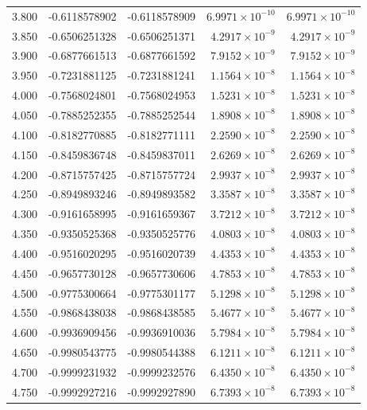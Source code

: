 \documentclass[11pt,a4paper]{article}
\begin{document}
\begin{longtable}{rrrrr}
3.800 & -0.6118578902 & -0.6118578909 & $6.9971\times 10^{-10}$ & $6.9971\times 10^{-10}$ \\
3.850 & -0.6506251328 & -0.6506251371 & $4.2917\times 10^{-9}$ & $4.2917\times 10^{-9}$ \\
3.900 & -0.6877661513 & -0.6877661592 & $7.9152\times 10^{-9}$ & $7.9152\times 10^{-9}$ \\
3.950 & -0.7231881125 & -0.7231881241 & $1.1564\times 10^{-8}$ & $1.1564\times 10^{-8}$ \\
4.000 & -0.7568024801 & -0.7568024953 & $1.5231\times 10^{-8}$ & $1.5231\times 10^{-8}$ \\
4.050 & -0.7885252355 & -0.7885252544 & $1.8908\times 10^{-8}$ & $1.8908\times 10^{-8}$ \\
4.100 & -0.8182770885 & -0.8182771111 & $2.2590\times 10^{-8}$ & $2.2590\times 10^{-8}$ \\
4.150 & -0.8459836748 & -0.8459837011 & $2.6269\times 10^{-8}$ & $2.6269\times 10^{-8}$ \\
4.200 & -0.8715757425 & -0.8715757724 & $2.9937\times 10^{-8}$ & $2.9937\times 10^{-8}$ \\
4.250 & -0.8949893246 & -0.8949893582 & $3.3587\times 10^{-8}$ & $3.3587\times 10^{-8}$ \\
4.300 & -0.9161658995 & -0.9161659367 & $3.7212\times 10^{-8}$ & $3.7212\times 10^{-8}$ \\
4.350 & -0.9350525368 & -0.9350525776 & $4.0803\times 10^{-8}$ & $4.0803\times 10^{-8}$ \\
4.400 & -0.9516020295 & -0.9516020739 & $4.4353\times 10^{-8}$ & $4.4353\times 10^{-8}$ \\
4.450 & -0.9657730128 & -0.9657730606 & $4.7853\times 10^{-8}$ & $4.7853\times 10^{-8}$ \\
4.500 & -0.9775300664 & -0.9775301177 & $5.1298\times 10^{-8}$ & $5.1298\times 10^{-8}$ \\
4.550 & -0.9868438038 & -0.9868438585 & $5.4677\times 10^{-8}$ & $5.4677\times 10^{-8}$ \\
4.600 & -0.9936909456 & -0.9936910036 & $5.7984\times 10^{-8}$ & $5.7984\times 10^{-8}$ \\
4.650 & -0.9980543775 & -0.9980544388 & $6.1211\times 10^{-8}$ & $6.1211\times 10^{-8}$ \\
4.700 & -0.9999231932 & -0.9999232576 & $6.4350\times 10^{-8}$ & $6.4350\times 10^{-8}$ \\
4.750 & -0.9992927216 & -0.9992927890 & $6.7393\times 10^{-8}$ & $6.7393\times 10^{-8}$ \\

\end{longtable}
\end{document}
